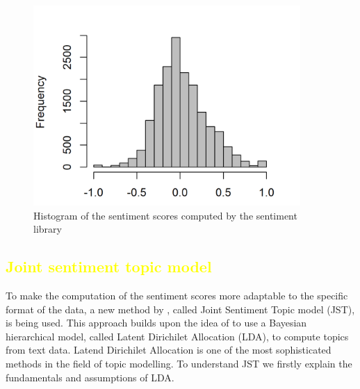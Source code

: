 \begin{figure}[h]
\centering
\includegraphics[width=4in]{figures/2SentimentsBOW_Histogram.png}
\caption{Histogram of the sentiment scores computed by the sentiment library}
\label{fig:BoWSentiment}
\end{figure}

\subsection{\textcolor{yellow}{Joint sentiment topic model}}\label{JST}
To make the computation of the sentiment scores more adaptable to the specific format of the data, a new method by \citet{lin2009joint}, called Joint Sentiment Topic model (JST), is being used. This approach builds upon the idea of \citet{blei2003latent} to use a Bayesian hierarchical model, called Latent Dirichilet Allocation (LDA), to compute topics from text data. Latend Dirichilet Allocation is one of the most sophisticated methods in the field of topic modelling. To understand JST we firstly explain the fundamentals and assumptions of LDA. \\ 

